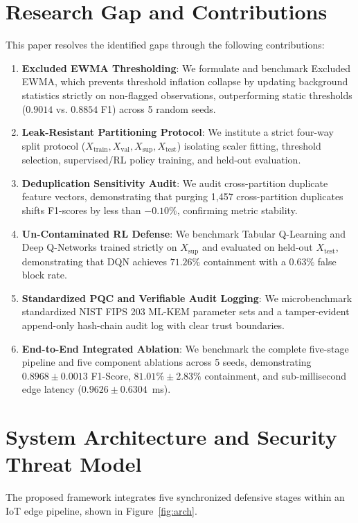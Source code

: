 \documentclass{ieeeaccess}
\begin{document}
\section{Research Gap and Contributions}
\label{sec:contributions}
This paper resolves the identified gaps through the following contributions:
\begin{enumerate}
    \item \textbf{Excluded EWMA Thresholding}: We formulate and benchmark Excluded EWMA, which prevents threshold inflation collapse by updating background statistics strictly on non-flagged observations, outperforming static thresholds ($0.9014$ vs. $0.8854$ F1) across 5 random seeds.
    \item \textbf{Leak-Resistant Partitioning Protocol}: We institute a strict four-way split protocol ($X_{\text{train}}, X_{\text{val}}, X_{\text{sup}}, X_{\text{test}}$) isolating scaler fitting, threshold selection, supervised/RL policy training, and held-out evaluation.
    \item \textbf{Deduplication Sensitivity Audit}: We audit cross-partition duplicate feature vectors, demonstrating that purging 1,457 cross-partition duplicates shifts F1-scores by less than $-0.10\%$, confirming metric stability.
    \item \textbf{Un-Contaminated RL Defense}: We benchmark Tabular Q-Learning and Deep Q-Networks trained strictly on $X_{\text{sup}}$ and evaluated on held-out $X_{\text{test}}$, demonstrating that DQN achieves $71.26\%$ containment with a $0.63\%$ false block rate.
    \item \textbf{Standardized PQC and Verifiable Audit Logging}: We microbenchmark standardized NIST FIPS 203 ML-KEM parameter sets and a tamper-evident append-only hash-chain audit log with clear trust boundaries.
    \item \textbf{End-to-End Integrated Ablation}: We benchmark the complete five-stage pipeline and five component ablations across 5 seeds, demonstrating $0.8968 \pm 0.0013$ F1-Score, $81.01\% \pm 2.83\%$ containment, and sub-millisecond edge latency ($0.9626 \pm 0.6304$~ms).
\end{enumerate}

\section{System Architecture and Security Threat Model}
\label{sec:architecture}
The proposed framework integrates five synchronized defensive stages within an IoT edge pipeline, shown in Figure~\ref{fig:arch}.
\end{document}
